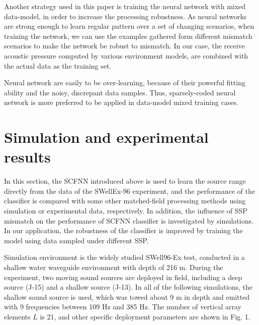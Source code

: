 
Another strategy used in this paper is training the neural network with mixed data-model, in order to increase the processing robustness.
As neural networks are strong enough to learn regular pattern over a set of changing scenarios,
when training the network, we can use the examples gathered form different mismatch scenarios to make the network be robust to mismatch. In our case, the receive acoustic pressure computed by various environment models, are combined with the actual data as the training set.

Neural network are easily to be over-learning, because of their powerful fitting ability and the noisy, discrepant data samples. Thus, sparsely-coded neural network is more preferred to be applied in data-model mixed training cases.

\section{Simulation and experimental results}
In this section, the SCFNN introduced above is used to learn the source range directly from the data of the SWellEx-96 experiment, and the performance of the classifier is compared with some other matched-field processing methods using simulation or experimental data, respectively. In addition, the influence of SSP mismatch on the performance of SCFNN classifier is investigated by simulations. In our application, the robustness of the classifier is improved by training the model using data sampled under different SSP.

Simulation environment is the widely studied SWell96-Ex test, conducted in a shallow water waveguide environment with depth of 216 m.
During the experiment, two moving sound sources are deployed in field, including a deep source (J-15) and a shallow source (J-13). In all of the following simulations, the shallow sound source is used, which was towed about 9 m in depth and emitted with 9 frequencies between 109 Hz and 385 Hz. The number of vertical array elements $L$ is 21, and other specific deployment parameters are shown in Fig. 1.

